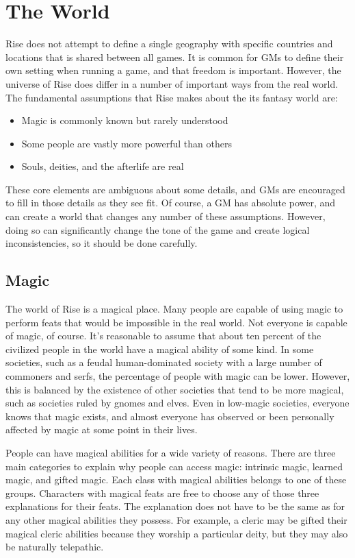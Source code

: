 \chapter{The World}

Rise does not attempt to define a single geography with specific countries and locations that is shared between all games.
It is common for GMs to define their own setting when running a game, and that freedom is important.
However, the universe of Rise does differ in a number of important ways from the real world.
The fundamental assumptions that Rise makes about the its fantasy world are:

\begin{itemize}
  \item Magic is commonly known but rarely understood
  \item Some people are vastly more powerful than others
  \item Souls, deities, and the afterlife are real
\end{itemize}

These core elements are ambiguous about some details, and GMs are encouraged to fill in those details as they see fit.
Of course, a GM has absolute power, and can create a world that changes any number of these assumptions.
However, doing so can significantly change the tone of the game and create logical inconsistencies, so it should be done carefully.

\section{Magic}
  The world of Rise is a magical place.
  Many people are capable of using magic to perform feats that would be impossible in the real world.
  Not everyone is capable of magic, of course.
  It's reasonable to assume that about ten percent of the civilized people in the world have a magical ability of some kind.
  In some societies, such as a feudal human-dominated society with a large number of commoners and serfs, the percentage of people with magic can be lower.
  However, this is balanced by the existence of other societies that tend to be more magical, such as societies ruled by gnomes and elves.
  Even in low-magic societies, everyone knows that magic exists, and almost everyone has observed or been personally affected by magic at some point in their lives.

  People can have magical abilities for a wide variety of reasons.
  There are three main categories to explain why people can access magic: intrinsic magic, learned magic, and gifted magic.
  Each class with magical abilities belongs to one of these groups.
  Characters with magical feats are free to choose any of those three explanations for their feats.
  The explanation does not have to be the same as for any other magical abilities they possess.
  For example, a cleric may be gifted their magical cleric abilities because they worship a particular deity, but they may also be naturally telepathic.

